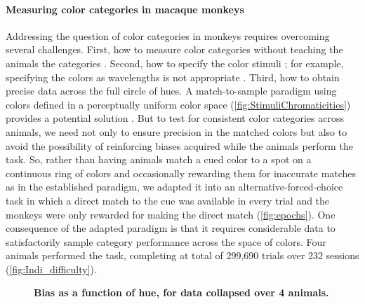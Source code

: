 \paragraph{Measuring color categories in macaque monkeys}

Addressing the question of color categories in monkeys requires overcoming several challenges. 
First, how to measure color categories without teaching the animals the categories \citep{essock_color_1977,matsuno_color_2004}.
Second, how to specify the color stimuli \citep{siuda-krzywicka_biological_2019}; for example, specifying the colors as wavelengths \citep{sandell_color_1979}
is not appropriate \citep{davidoff_cross-species_2010}. 
Third, how to obtain precise data across the full circle of hues. 
A match-to-sample paradigm using colors defined in a perceptually uniform color space (\autoref{fig:StimuliChromaticities}) provides a potential solution \citep{bae_why_2015,panichello_error-correcting_2019}.
But to test for consistent color categories across animals, we need not only to ensure precision in the matched colors but also to avoid the possibility of reinforcing biases acquired while the animals perform the task. 
So, rather than having animals match a cued color to a spot on a continuous ring of colors and occasionally rewarding them for inaccurate matches as in the established paradigm, we adapted it into an alternative-forced-choice task in which a direct match to the cue was available in every trial and the monkeys were only rewarded for making the direct match (\autoref{fig:epochs}). 
One consequence of the adapted paradigm is that it requires considerable data to satisfactorily sample category performance across the space of colors. 
Four animals performed the task, completing at total of 299,690 trials over 232 sessions (\autoref{fig:Indi_difficulty}).

\begin{figure}
    \centering
        \begin{subfigure}[t]{0.36\textwidth}
         \centering
         \caption{}
         
         \label{fig:CombinedDifficulty}
    \end{subfigure}
    \hfill
    \begin{subfigure}[t]{0.36\textwidth}
         \centering
         \caption{}
         
         \label{fig:CombinedLinear}
    \end{subfigure}
    \hfill
    \begin{subfigure}[t]{0.25\textwidth}
         \centering
         \caption{}
         
         \label{fig:CombinedPolar}
    \end{subfigure}
    \caption{\textbf{Bias as a function of hue, for data collapsed over 4 animals.} 
    }
    \label{fig:AvResults}
\end{figure}

